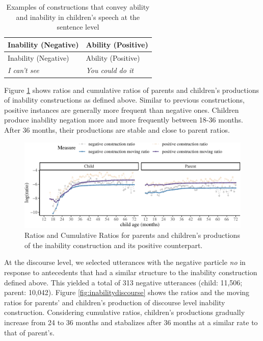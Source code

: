 \documentclass[
  english,
  man,floatsintext]{apa6}
\begin{document}
\begin{longtable}[]{@{}ll@{}}
\caption{\label{tab:inab} Examples of constructions that convey ability and inability in children's speech at the sentence level}\tabularnewline
\toprule
Inability (Negative) & Ability (Positive) \\
\midrule
\endfirsthead
\toprule
Inability (Negative) & Ability (Positive) \\
\midrule
\endhead
\emph{I can't see} & \emph{You could do it} \\
\bottomrule
\end{longtable}

Figure \ref{fig:inability} shows ratios and cumulative ratios of parents and children's productions of inability constructions as defined above. Similar to previous constructions, positive instances are generally more frequent than negative ones. Children produce inability negation more and more frequently between 18-36 months. After 36 months, their productions are stable and close to parent ratios.

\begin{figure}[H]

{\centering \includegraphics{neg_construction_article_files/figure-latex/inability-1} 

}

\caption{Ratios and Cumulative Ratios for parents and children's productions of the inability construction and its positive counterpart.}\label{fig:inability}
\end{figure}

At the discourse level, we selected utterances with the negative particle \emph{no} in response to antecedents that had a similar structure to the inability construction defined above. This yielded a total of 313 negative utterances (child: 11,506; parent: 10,042). Figure \ref{fig:inabilitydiscourse} shows the ratios and the moving ratios for parents' and children's production of discourse level inability construction. Considering cumulative ratios, children's productions gradually increase from 24 to 36 months and stabalizes after 36 months at a similar rate to that of parent's.
\end{document}

